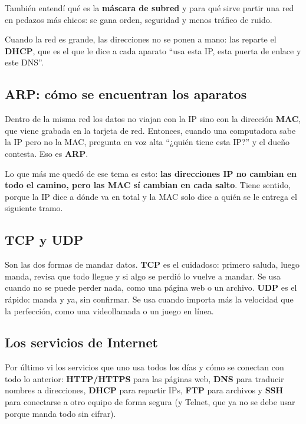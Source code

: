 \documentclass[11pt,a4paper]{article}
\begin{document}
También entendí qué es la \textbf{máscara de subred} y para qué sirve partir una
red en pedazos más chicos: se gana orden, seguridad y menos tráfico de ruido.

Cuando la red es grande, las direcciones no se ponen a mano: las reparte el
\textbf{DHCP}, que es el que le dice a cada aparato ``usa esta IP, esta puerta
de enlace y este DNS''.

\subsection{ARP: cómo se encuentran los aparatos}

Dentro de la misma red los datos no viajan con la IP sino con la dirección
\textbf{MAC}, que viene grabada en la tarjeta de red. Entonces, cuando una
computadora sabe la IP pero no la MAC, pregunta en voz alta ``¿quién tiene esta
IP?'' y el dueño contesta. Eso es \textbf{ARP}.

Lo que más me quedó de ese tema es esto: \textbf{las direcciones IP no cambian
en todo el camino, pero las MAC sí cambian en cada salto}. Tiene sentido, porque
la IP dice a dónde va en total y la MAC solo dice a quién se le entrega el
siguiente tramo.

\subsection{TCP y UDP}

Son las dos formas de mandar datos. \textbf{TCP} es el cuidadoso: primero
saluda, luego manda, revisa que todo llegue y si algo se perdió lo vuelve a
mandar. Se usa cuando no se puede perder nada, como una página web o un archivo.
\textbf{UDP} es el rápido: manda y ya, sin confirmar. Se usa cuando importa más
la velocidad que la perfección, como una videollamada o un juego en línea.

\subsection{Los servicios de Internet}

Por último vi los servicios que uno usa todos los días y cómo se conectan con
todo lo anterior: \textbf{HTTP/HTTPS} para las páginas web, \textbf{DNS} para
traducir nombres a direcciones, \textbf{DHCP} para repartir IPs, \textbf{FTP}
para archivos y \textbf{SSH} para conectarse a otro equipo de forma segura (y
Telnet, que ya no se debe usar porque manda todo sin cifrar).

\end{document}
